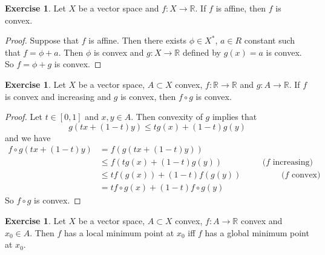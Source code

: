 \documentclass[12pt]{amsart}
\theoremstyle{definition}
\newtheorem{ex}[definition]{Exercise}
\newcommand{\R}{\mathbb{R}}
\newcommand{\lex}[1]{\label{ex:#1}}
\begin{document}
	\begin{ex} \lex{91007}
	Let $X$ be a vector space and $f: X \rightarrow \R$. If $f$ is affine, then $f$ is convex.
	\end{ex}
	
	\begin{proof}
	Suppose that $f$ is affine. Then there exists $\phi \in X^*$, $a \in R$ constant such that $f = \phi + a$. Then $\phi$ is convex and $g: X \rightarrow \R$ defined by $g(x) = a$ is convex. So $f = \phi + g$ is convex.
	\end{proof}
	
	\begin{ex} \lex{91008}
	Let $X$ be a vector space, $A \subset X$ convex, $f:\R \rightarrow \R$ and $g: A \rightarrow \R$. If $f$ is convex and increasing and $g$ is convex, then $f \circ g$ is convex.
	\end{ex}	
	
	\begin{proof}
	Let $t \in [0,1]$ and $x, y \in A$. Then convexity of $g$ implies that $$g(tx +(1-t)y) \leq tg(x) + (1-t)g(y)$$ and we have
	\begin{align*}
	f\circ g(tx +(1-t)y) 
	&= f(g(tx +(1-t)y)) \\
	& \leq f(tg(x) + (1-t)g(y)) \hspace{2cm} (f \text{ increasing)}\\
	& \leq tf(g(x)) + (1-t)f(g(y)) \hspace{2cm}  (f \text{ convex)}\\	
	&= tf \circ g(x) + (1-t)f \circ g(y)
\end{align*}	 
So $f \circ g$ is convex.
	\end{proof}
	
	\begin{ex} \lex{91009}
	Let $X$ be a vector space, $A \subset X$ convex, $f:A \rightarrow \R$ convex and $x_0 \in A$. Then $f$ has a local minimum point at $x_0$ iff $f$ has a global minimum point at $x_0$.
	\end{ex}	
	
\end{document}
